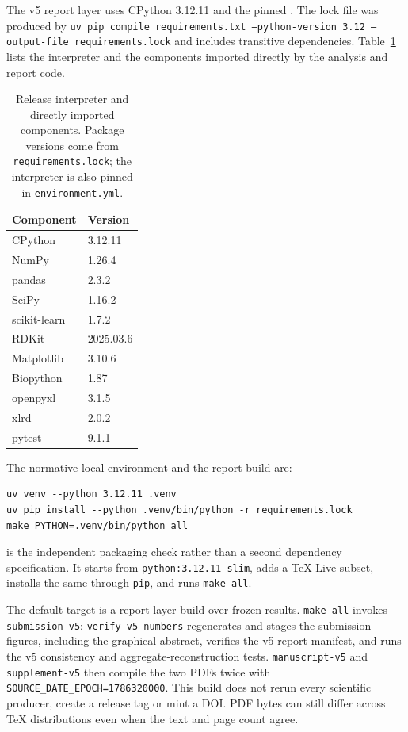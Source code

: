 

The v5 report layer uses CPython 3.12.11 and the pinned . The lock file was
produced by \texttt{uv pip compile requirements.txt --python-version 3.12 --output-file
requirements.lock} and includes transitive dependencies. Table~\ref{tab:s7env} lists the
interpreter and the components imported directly by the analysis and report code.

\begin{table}[htbp]
\centering
\caption{Release interpreter and directly imported components. Package versions come from
\texttt{requirements.lock}; the interpreter is also pinned in \texttt{environment.yml}.}
\label{tab:s7env}
\small
\begin{tabular}{ll}
\toprule
Component & Version \\
\midrule
CPython & 3.12.11 \\
NumPy \cite{numpy2020} & 1.26.4 \\
pandas & 2.3.2 \\
SciPy \cite{scipy2020} & 1.16.2 \\
scikit-learn & 1.7.2 \\
RDKit \cite{rdkit2025} & 2025.03.6 \\
Matplotlib \cite{matplotlib2007} & 3.10.6 \\
Biopython & 1.87 \\
openpyxl & 3.1.5 \\
xlrd & 2.0.2 \\
pytest & 9.1.1 \\
\bottomrule
\end{tabular}
\end{table}

The normative local environment and the report build are:

\begin{verbatim}
uv venv --python 3.12.11 .venv
uv pip install --python .venv/bin/python -r requirements.lock
make PYTHON=.venv/bin/python all
\end{verbatim}

 is the independent packaging check rather than a second dependency
specification. It starts from \texttt{python:3.12.11-slim}, adds a TeX Live subset, installs the
same  through \texttt{pip}, and runs \texttt{make all}.

The default target is a report-layer build over frozen results. \texttt{make all} invokes
\texttt{submission-v5}: \texttt{verify-v5-numbers} regenerates and stages the submission figures,
including the graphical abstract, verifies the v5 report manifest, and runs the v5 consistency
and aggregate-reconstruction tests. \texttt{manuscript-v5} and
\texttt{supplement-v5} then compile the two PDFs twice with
\texttt{SOURCE\_DATE\_EPOCH=1786320000}. This build does not rerun every scientific producer,
create a release tag or mint a DOI. PDF bytes can still differ across TeX distributions even
when the text and page count agree.

